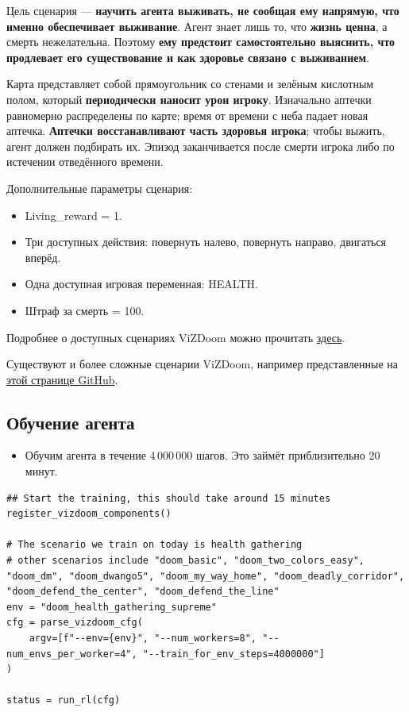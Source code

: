 \documentclass[11pt,a4paper]{article}
\begin{document}
Цель сценария --- \textbf{научить агента выживать, не сообщая ему напрямую, что именно обеспечивает выживание}. Агент знает лишь то, что \textbf{жизнь ценна}, а смерть нежелательна. Поэтому \textbf{ему предстоит самостоятельно выяснить, что продлевает его существование и как здоровье связано с выживанием}.

Карта представляет собой прямоугольник со стенами и зелёным кислотным полом, который \textbf{периодически наносит урон игроку}. Изначально аптечки равномерно распределены по карте; время от времени с неба падает новая аптечка. \textbf{Аптечки восстанавливают часть здоровья игрока}; чтобы выжить, агент должен подбирать их. Эпизод заканчивается после смерти игрока либо по истечении отведённого времени.

Дополнительные параметры сценария:

\begin{itemize}
\tightlist
\item
  Living\_reward = 1.
\item
  Три доступных действия: повернуть налево, повернуть направо, двигаться вперёд.
\item
  Одна доступная игровая переменная: HEALTH.
\item
  Штраф за смерть = 100.
\end{itemize}

Подробнее о доступных сценариях ViZDoom можно прочитать \href{https://github.com/Farama-Foundation/ViZDoom/tree/master/scenarios}{здесь}.

Существуют и более сложные сценарии ViZDoom, например представленные на \href{https://github.com/edbeeching/3d_control_deep_rl}{этой странице GitHub}.

\subsection{Обучение агента}\label{training-the-agent}

\begin{itemize}
\tightlist
\item
  Обучим агента в течение 4\,000\,000 шагов. Это займёт приблизительно 20 минут.
\end{itemize}

\begin{lstlisting}
## Start the training, this should take around 15 minutes
register_vizdoom_components()

# The scenario we train on today is health gathering
# other scenarios include "doom_basic", "doom_two_colors_easy", "doom_dm", "doom_dwango5", "doom_my_way_home", "doom_deadly_corridor", "doom_defend_the_center", "doom_defend_the_line"
env = "doom_health_gathering_supreme"
cfg = parse_vizdoom_cfg(
    argv=[f"--env={env}", "--num_workers=8", "--num_envs_per_worker=4", "--train_for_env_steps=4000000"]
)

status = run_rl(cfg)
\end{lstlisting}
\end{document}
